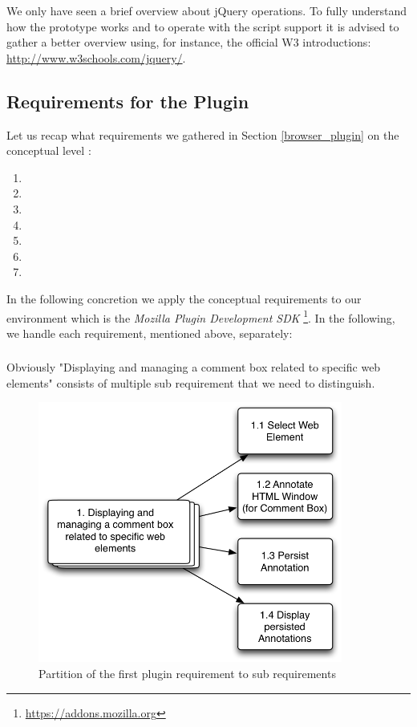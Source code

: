 We only have seen a brief overview about jQuery operations. To fully understand how the prototype works and to operate with the script support it is advised to gather a better overview using, for instance, the official W3 introductions: \url{http://www.w3schools.com/jquery/}. 

\newpage
\subsection{Requirements for the Plugin}\label{firefox_plugin_requirements}
Let us recap what requirements we gathered in Section \ref{browser_plugin} on the conceptual level \cite{van2009requirements}:

\begin{enumerate}
\item \reqPi
\item \reqPii
\item \reqPiii
\item \reqPiv
\item \reqPv
\item \reqPvi
\item \reqPvii
\end{enumerate}

In the following concretion we apply the conceptual requirements to our environment which is the \emph{Mozilla Plugin Development SDK} \footnote{\url{https://addons.mozilla.org}}. In the following, we handle each requirement, mentioned above, separately:

\subsubsection[Visualizing]{\reqPi}\label{display-management-requirement}
Obviously "Displaying and managing a comment box related to specific web elements" consists of multiple sub requirement that we need to distinguish. 

\begin{figure}\centering
		\includegraphics[width=10cm]{images/abstract2concrete-1.png}
		\caption{Partition of the first plugin requirement to sub requirements}
		\label{abstract2concrete-1}
\end{figure} 

